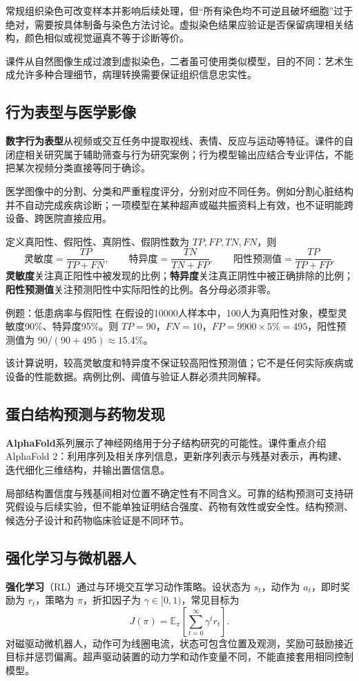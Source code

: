 \documentclass[UTF8,fontset=none,zihao=-4,a4paper]{ctexart}
\newcommand{\term}[1]{\textbf{#1}}
\begin{document}
常规组织染色可改变样本并影响后续处理，但“所有染色均不可逆且破坏细胞”过于绝对，需要按具体制备与染色方法讨论。虚拟染色结果应验证是否保留病理相关结构，颜色相似或视觉逼真不等于诊断等价。

课件从自然图像生成过渡到虚拟染色，二者虽可使用类似模型，目的不同：艺术生成允许多种合理细节，病理转换需要保证组织信息忠实性。

\subsection{行为表型与医学影像}
\term{数字行为表型}从视频或交互任务中提取视线、表情、反应与运动等特征。课件的自闭症相关研究属于辅助筛查与行为研究案例；行为模型输出应结合专业评估，不能把某次视频分类直接等同于确诊。

医学图像中的分割、分类和严重程度评分，分别对应不同任务。例如分割心脏结构并不自动完成疾病诊断；一项模型在某种超声或磁共振资料上有效，也不证明能跨设备、跨医院直接应用。

定义真阳性、假阳性、真阴性、假阴性数为 $TP,FP,TN,FN$，则
\[
\text{灵敏度}=\frac{TP}{TP+FN},\qquad
\text{特异度}=\frac{TN}{TN+FP},\qquad
\text{阳性预测值}=\frac{TP}{TP+FP}.
\]
\term{灵敏度}关注真正阳性中被发现的比例；\term{特异度}关注真正阴性中被正确排除的比例；\term{阳性预测值}关注预测阳性中实际阳性的比例。各分母必须非零。

\begin{infobox}{例题：低患病率与假阳性}
在假设的10000人样本中，100人为真阳性对象，模型灵敏度90\%、特异度95\%。则 $TP=90$，$FN=10$，$FP=9900\times5\%=495$，阳性预测值为 $90/(90+495)\approx15.4\%$。
\end{infobox}
该计算说明，较高灵敏度和特异度不保证较高阳性预测值；它不是任何实际疾病或设备的性能数据。病例比例、阈值与验证人群必须共同解释。

\subsection{蛋白结构预测与药物发现}
\term{AlphaFold}系列展示了神经网络用于分子结构研究的可能性。课件重点介绍AlphaFold 2：利用序列及相关序列信息，更新序列表示与残基对表示，再构建、迭代细化三维结构，并输出置信信息。

局部结构置信度与残基间相对位置不确定性有不同含义。可靠的结构预测可支持研究假设与后续实验，但不能单独证明结合强度、药物有效性或安全性。结构预测、候选分子设计和药物临床验证是不同环节。

\subsection{强化学习与微机器人}
\term{强化学习}（RL）通过与环境交互学习动作策略。设状态为 $s_t$，动作为 $a_t$，即时奖励为 $r_t$，策略为 $\pi$，折扣因子为 $\gamma\in[0,1)$，常见目标为
\[
J(\pi)=\mathbb E_\pi\!\left[\sum_{t=0}^{\infty}\gamma^t r_t\right].
\]
对磁驱动微机器人，动作可为线圈电流，状态可包含位置及观测，奖励可鼓励接近目标并惩罚偏离。超声驱动装置的动力学和动作变量不同，不能直接套用相同控制模型。
\end{document}
